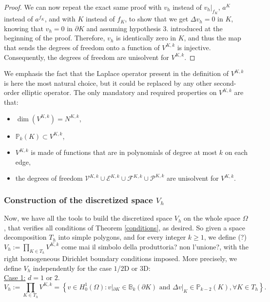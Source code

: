 \begin{proof}
We can now repeat the exact same proof with $v_h$ instead of $v_h|_{f_K}$, $a^K$ instead of $a^{f_K}$, and with $K$ instead of $f_K$, to show that we get $\Delta v_h = 0$ in $K$, knowing that $v_h = 0$ in $\partial K$ and assuming hypothesis $3.$ introduced at the beginning of the proof. Therefore, $v_h$ is identically zero in $K$, and thus the map that sends the degrees of freedom onto a function of $V^{K,k}$ is injective. Consequently, the degrees of freedom are unisolvent for $V^{K,k}$. 
\end{proof}

\begin{remark}
We emphasis the fact that the Laplace operator present in the definition of $V^{K,k}$ is here the most natural choice, but it could be replaced by any other second-order elliptic operator. The only mandatory and required properties on $V^{K,k}$ are that: 
\begin{itemize}
\item $\dim\left(V^{K,k}\right) = N^{K,k}$, 
\item $\mathbb{P}_{k}(K)\subset V^{K,k}$, 
\item $V^{K,k}$ is made of functions that are in polynomials of degree at most $k$ on each edge, 
\item the degrees of freedom $\mathcal{V}^{K,k}\cup\mathcal{E}^{K,k}\cup \mathcal{F}^{K,k}\cup\mathcal{P}^{K,k}$ are unisolvent for $V^{K,k}$.
\end{itemize}
\end{remark}

\subsubsection{Construction of the discretized space $V_h$}
Now, we have all the tools to build the discretized space $V_h$ on the whole space $\Omega$, that verifies all conditions of Theorem \ref{conditions}, as desired. So given a space decomposition $T_h$ into simple polygons, and for every integer $k\geq 1$, {\color{red} we define (?) }$V_h:=\prod_{K\in T_h} V^{K,k}$ 
{\color{red} come mai il simbolo della produttoria? non l'unione?}, with the right homogeneous Dirichlet boundary conditions imposed. More precisely, we define $V_h$ independently for the case $1$/$2$D or $3$D:\\

\noindent \underline{Case 1:} $d=1$ or $2$.
$$
V_h := \prod_{K\in T_h} V^{K,k} = \left\{v\in H^1_0(\Omega): v|_{\partial K} \in \mathbb{B}_k(\partial K) \text{ and } \Delta v|_K \in \mathbb{P}_{k-2}(K), \forall K\in T_h \right\}.
$$

